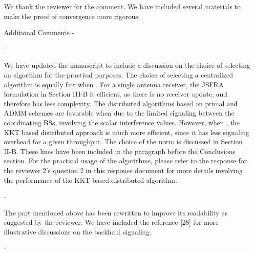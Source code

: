 \begin{enumerate}
\resp We thank the reviewer for the comment. We have included several materials to make the proof of convergence more rigorous.

Additional Comments - 

\begin{enumerate}
	
	 - 
	
	\resp We have updated the manuscript to include a discussion on the choice of selecting an algorithm for the practical purposes. The choice of selecting a centralized algorithm is equally fair when . For a single antenna receiver, the \ac{JSFRA} formulation in Section III-B is efficient, as there is no receiver update, and therefore has less complexity. The distributed algorithms based on primal and \ac{ADMM} schemes are favorable when  due to the limited signaling between the coordinating \acp{BS}, involving the scalar interference values. However, when , the \ac{KKT} based distributed approach is much more efficient, since it has less signaling overhead for a given throughput. The choice of the  norm is discussed in Section II-B. These lines have been included in the paragraph before the Conclusions section. For the practical usage of the algorithms, please refer to the response for the reviewer 2's question 2 in this response document for more details involving the performance of the KKT based distributed algorithm.
	
	 - 
	
	\resp The part mentioned above has been rewritten to improve its readability as suggested by the reviewer. We have included the reference [28] for more illustrative discussions on the backhaul signaling. 
	
	 - 
	

\end{enumerate}
\end{enumerate}
